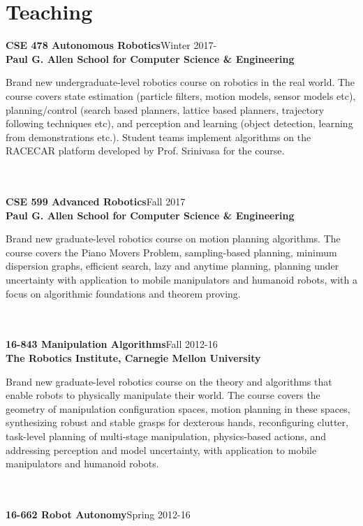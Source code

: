 
\section{Teaching}
\noindent
\textbf{CSE 478 Autonomous Robotics}\hfill Winter 2017-\\
\textbf{Paul G. Allen School for Computer Science \& Engineering}\\
\parbox[t]{0.75\textwidth}{
Brand new undergraduate-level robotics course on robotics in the real world. The course covers state estimation (particle filters, motion models, sensor models etc), planning/control (search based planners, lattice based planners, trajectory following techniques etc), and perception and learning (object detection, learning from demonstrations etc.). Student teams implement algorithms on the RACECAR platform developed by Prof. Srinivasa for the course.
}\\
\\
\noindent
\textbf{CSE 599 Advanced Robotics}\hfill Fall 2017\\
\textbf{Paul G. Allen School for Computer Science \& Engineering}\\
\parbox[t]{0.75\textwidth}{
Brand new graduate-level robotics course on motion planning algorithms. The course covers the Piano Movers Problem, sampling-based planning, minimum dispersion graphs, efficient search, lazy and anytime planning, planning under uncertainty with application to mobile manipulators and humanoid robots, with a focus on algorithmic foundations and theorem proving.
}\\
\\
\noindent
\textbf{16-843 Manipulation Algorithms}\hfill Fall 2012-16\\
\textbf{The Robotics Institute, Carnegie Mellon University}\\
\parbox[t]{0.75\textwidth}{
Brand new graduate-level robotics course on the theory and algorithms that enable robots to physically manipulate their world. The course covers the geometry of manipulation configuration spaces, motion planning in these spaces, synthesizing robust and stable grasps for dexterous hands, reconfiguring clutter, task-level planning of multi-stage manipulation, physics-based actions, and addressing perception and model uncertainty, with application to mobile manipulators and humanoid robots.
}\\
\\
\noindent
\textbf{16-662 Robot Autonomy}\hfill Spring 2012-16\\
